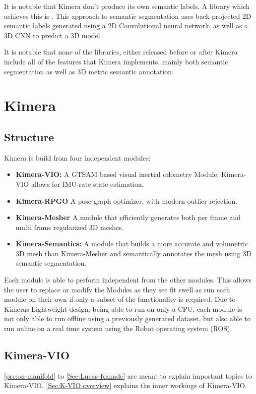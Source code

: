 \documentclass[11pt,a4paper]{article}
\begin{document}
It is notable that Kimera don't produce its own semantic labels. 
A library which achieves this is \cite{murez2020atlas}.
This approach to semantic segmentation uses back projected 2D semantic labels generated using a 2D Convolutional neural network, as well as a 3D CNN to predict a 3D model. 


It is notable that none of the libraries, either released before or after Kimera include all of the features that Kimera implements,
mainly both semantic segmentation as well as 3D metric semantic annotation.



 
\section{Kimera} \label{Sec:kimera}
\subsection{Structure}
Kimera is build from four independent modules: 
\begin{itemize}
    \item \textbf{Kimera-VIO:} A GTSAM \cite{gtsam} based visual inertial odometry Module. Kimera-VIO allows for IMU-rate state estimation. 
    \item \textbf{Kimera-RPGO} A pose graph optimizer, with modern outlier rejection.
    \item \textbf{Kimera-Mesher} A module that efficiently generates both per frame and multi frame regularized 3D meshes. 
    \item \textbf{Kimera-Semantics:} A module that builds a more accurate and volumetric 3D mesh than Kimera-Mesher and semantically annotates the mesh using 3D semantic segmentation. 
\end{itemize}
Each module is able to perform independent from the other modules. 
This allows the user to replace or modify the Modules as they see fit swell as run each module on their own if only a subset of the functionality is required.
Due to Kimeras Lightweight design, being able to run on only a CPU, each module is not only able to run  offline using a previously generated dataset, but also able to run online on a real time system using the Robot operating system (ROS).

\subsection{Kimera-VIO}
\ref{pre:on-manifold} to \ref{Sec:Lucas-Kanade} are meant to explain important topics to Kimera-VIO.
\ref{Sec:K-VIO overview} explains the inner workings of Kimera-VIO.
\end{document}
